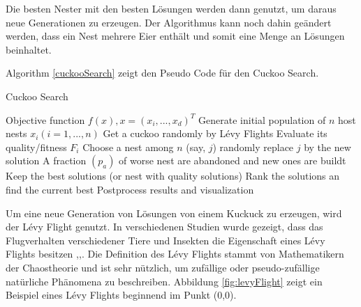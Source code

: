 \documentclass[conference]{IEEEtran}
\begin{document}
      Die besten Nester mit den besten Lösungen werden dann genutzt, um daraus neue Generationen zu erzeugen. 
      Der Algorithmus kann noch dahin geändert werden, dass ein Nest mehrere Eier enthält und somit eine Menge an Lösungen beinhaltet.

      {Algorithm \ref{cuckooSearch}} zeigt den Pseudo Code für den Cuckoo Search. 

      \begin{algorithm}
      \caption{Cuckoo Search}\label{cuckooSearch}
        \begin{algorithmic}[1]
        \State Objective function $f(x), x = (x_{i}, ...,x_{d})^T$
        \State Generate initial population of $n$ host nests $x_{i} (i =1,...,n)$
          \State Get a cuckoo randomly by Lévy Flights
          \State Evaluate its quality/fitness $F_{i}$
          \State Choose a nest among $n$ (say, $j$) randomly
            \State replace $j$ by the new solution
          \EndIf
          \State A fraction $(p_{a})$ of worse nest are abandoned 
          \State and new ones are buildt 
          \State Keep the best solutions (or nest with quality solutions)
          \State Rank the solutions an find the current best
        \EndWhile
        \State Postprocess results and visualization
        \end{algorithmic}
      \end{algorithm}

      Um eine neue Generation von Lösungen von einem Kuckuck zu erzeugen, wird der Lévy Flight genutzt. 
      In verschiedenen Studien wurde gezeigt, dass das Flugverhalten verschiedener Tiere und Insekten die 
      Eigenschaft eines Lévy Flights besitzen \cite{b4},\cite{b5},\cite{b6}. Die Definition des Lévy Flights 
      stammt von Mathematikern der Chaostheorie und ist sehr nützlich, um zufällige oder pseudo-zufällige natürliche 
      Phänomena zu beschreiben. Abbildung \ref{fig:levyFlight} zeigt ein Beispiel eines Lévy Flights beginnend im Punkt (0,0).
\end{document}

